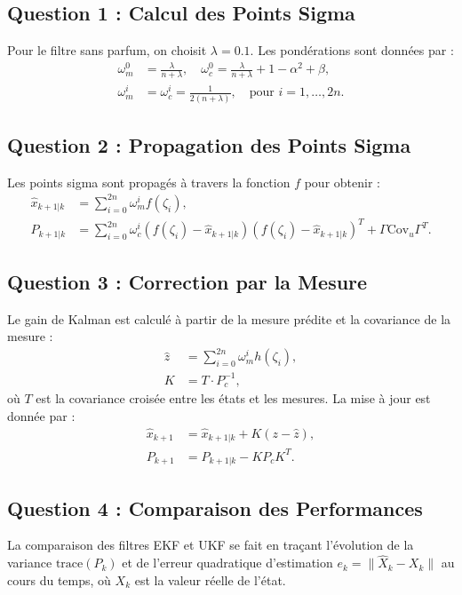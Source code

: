 \subsection{Question 1 : Calcul des Points Sigma}
Pour le filtre sans parfum, on choisit \( \lambda = 0.1 \). Les pondérations sont données par :
\begin{align}
    \omega_m^0 &= \frac{\lambda}{n + \lambda}, \quad \omega_c^0 = \frac{\lambda}{n + \lambda} + 1 - \alpha^2 + \beta, \\
    \omega_m^i &= \omega_c^i = \frac{1}{2(n + \lambda)}, \quad \text{pour } i = 1, \dots, 2n.
\end{align}

\subsection{Question 2 : Propagation des Points Sigma}
Les points sigma sont propagés à travers la fonction \( f \) pour obtenir :
\begin{align}
    \hat{x}_{k+1|k} &= \sum_{i=0}^{2n} \omega_m^i f(\zeta_i), \\
    P_{k+1|k} &= \sum_{i=0}^{2n} \omega_c^i (f(\zeta_i) - \hat{x}_{k+1|k})(f(\zeta_i) - \hat{x}_{k+1|k})^T + \Gamma \text{Cov}_u \Gamma^T.
\end{align}

\subsection{Question 3 : Correction par la Mesure}
Le gain de Kalman est calculé à partir de la mesure prédite et la covariance de la mesure :
\begin{align}
    \hat{z} &= \sum_{i=0}^{2n} \omega_m^i h(\zeta_i), \\
    K &= T \cdot P_c^{-1},
\end{align}
où \( T \) est la covariance croisée entre les états et les mesures. La mise à jour est donnée par :
\begin{align}
    \hat{x}_{k+1} &= \hat{x}_{k+1|k} + K (z - \hat{z}), \\
    P_{k+1} &= P_{k+1|k} - K P_c K^T.
\end{align}

\subsection{Question 4 : Comparaison des Performances}
La comparaison des filtres EKF et UKF se fait en traçant l'évolution de la variance \( \text{trace}(P_k) \) et de l'erreur quadratique d'estimation \( e_k = \|\hat{X}_k - X_k\| \) au cours du temps, où \( X_k \) est la valeur réelle de l'état.


